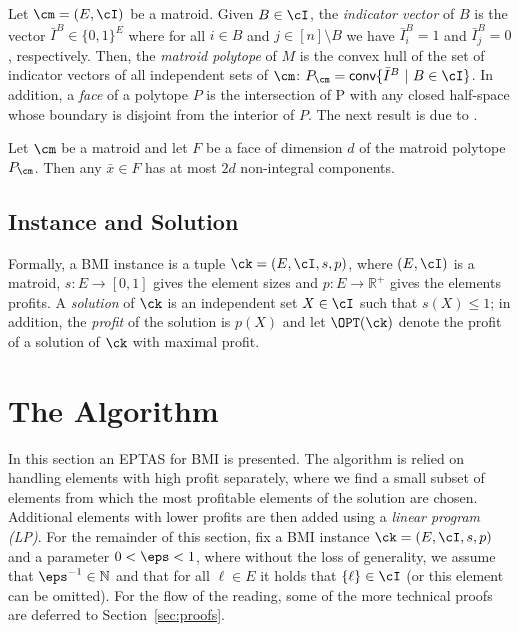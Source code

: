
Let $\cm = (E, \cI)$ be a matroid. Given $B \in \cI$, the {\em indicator vector} of $B$ is the vector $\bar{I}^B \in \{0,1\}^E$ where for all $i \in B$ and $j \in [n] \setminus B$ we have $\bar{I}^B_i = 1$ and  $\bar{I}^B_j = 0$, respectively. Then, the {\em matroid polytope} of $M$ is the convex hull of the set of indicator vectors of all independent sets of $\cm$: $P_{\cm} = \textsf{conv} \{\bar{I}^B~|~B \in \cI\}$. In addition, a {\em face} of a polytope $P$ is the intersection of P with any closed half-space whose boundary is disjoint from the interior of $P$. The next result is due to \cite{grandoni2010approximation}.

 \begin{lemma}
	\label{lem:integral}
	Let $\cm$ be a matroid and let $F$ be a face of dimension
	$d$ of the matroid polytope $P_{\cm}$. Then any $\bar{x} \in F$ has at most $2d$ non-integral
	components.
\end{lemma}


\subsection{Instance and Solution}


Formally, a BMI instance is a tuple $\ck =  (E,\cI,s,p)$, where $(E,\cI)$ is a matroid, $s:E \rightarrow [0,1]$  gives the element sizes and $p:E \rightarrow \mathbb{R}^+$ gives the elements profits. A {\em solution} of $\ck$ is an independent set $X \in \cI$ such that $s(X) \leq 1$; in addition, the {\em profit} of the solution is $p(X)$ and let $\OPT(\ck)$ denote the profit of a solution of $\ck$ with maximal profit. %



\section{The Algorithm}
\label{sec:alg}


In this section an EPTAS for BMI is presented. The algorithm is relied on handling elements with high profit separately, where we find a small subset of elements from which the most profitable elements of the solution are chosen. Additional elements with lower profits are then added using a {\em linear program (LP)}. For the remainder of this section, fix a BMI instance $\ck =  (E,\cI,s,p)$ and a parameter $0<\eps<1$, where without the loss of generality, we assume that $\eps^{-1} \in \mathbb{N}$ and that for all $\ell \in E$ it holds that $\{\ell\} \in \cI$ (or this element can be omitted). For the flow of the reading, some of the more technical proofs are deferred to Section~\ref{sec:proofs}. 


